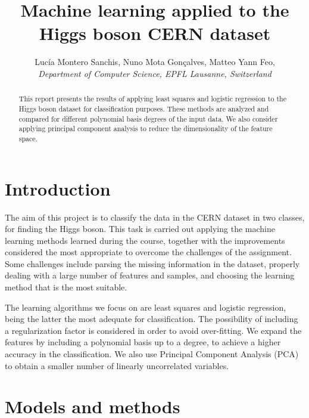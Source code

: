 \documentclass[10pt,conference,compsocconf]{IEEEtran}
\begin{document}
\title{Machine learning applied to the Higgs boson CERN dataset}

\author{
  Luc\'{i}a Montero Sanchis, Nuno Mota Gon\c{c}alves, Matteo Yann Feo,  \\
  \textit{Department of Computer Science, EPFL Lausanne, Switzerland}
}

\maketitle

\begin{abstract}
  This report presents the results of applying least squares and logistic regression to the Higgs boson dataset for classification purposes. These methods are analyzed and compared for different polynomial basis degrees of the input data. We also consider applying principal component analysis to reduce the dimensionality of the feature space.
\end{abstract}

\section{Introduction}
	The aim of this project is to classify the data in the CERN dataset in two classes, for finding the Higgs boson. This task is carried out applying the machine learning methods learned during the course, together with the improvements considered the most appropriate to overcome the challenges of the assignment. Some challenges include parsing the missing information in the dataset, properly dealing with a large number of features and samples, and choosing the learning method that is the most suitable.

	The learning algorithms we focus on are least squares and logistic regression, being the latter the most adequate for classification. The possibility of including a regularization factor is considered in order to avoid over-fitting. We expand the features by including a polynomial basis up to a degree, to achieve a higher accuracy in the classification. We also use Principal Component Analysis (PCA) to obtain a smaller number of linearly uncorrelated variables.


\section{Models and methods}
	\label{sec:models-methods}
\end{document}
